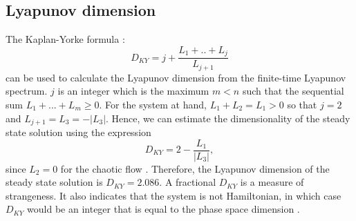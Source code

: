 \documentclass[final,5p,times,twocolumn]{elsarticle}
\begin{document}
\subsection{Lyapunov dimension}
The Kaplan-Yorke formula \cite{frederickson1983liapunov}:
\begin{equation}
D_{KY} = j + \frac{L_1+..+ L_j}{L_{j+1}}
\end{equation}
can be used to calculate the Lyapunov dimension from the finite-time Lyapunov spectrum. $j$ is an integer which is the maximum $m < n$ such that the sequential sum $L_1+...+ L_m\ge0$. For the system at hand, $L_1+L_2 = L_1 >0$ so that $j=2$ and $L_{j+1} = L_3 = -|L_3|$. Hence, we can estimate the dimensionality of the steady state solution using the expression
\begin{equation}
D_{KY} = 2 - \frac{L_1}{|L_3|},
\end{equation}
since $L_2=0$ for the chaotic flow \cite{sprott1994some}. Therefore, the Lyapunov dimension of the steady state solution is $D_{KY}=2.086$. A fractional $D_{KY}$ is a measure of strangeness. It also indicates that the system is not Hamiltonian, in which case $D_{KY}$ would be an integer that is equal to the phase space dimension \cite{IJET16826}.
\end{document}
